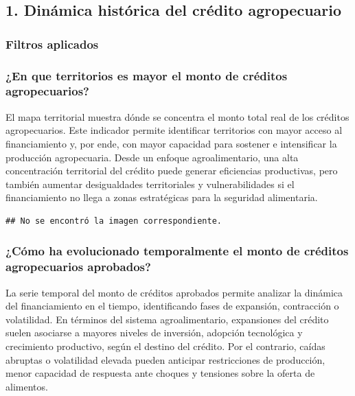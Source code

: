 \documentclass[
]{article}
\begin{document}
\subsection{1. Dinámica histórica del crédito
agropecuario}\label{dinuxe1mica-histuxf3rica-del-cruxe9dito-agropecuario}

\subsubsection{Filtros aplicados}\label{filtros-aplicados}

\subsubsection{¿En que territorios es mayor el monto de créditos
agropecuarios?}\label{en-que-territorios-es-mayor-el-monto-de-cruxe9ditos-agropecuarios}

El mapa territorial muestra dónde se concentra el monto total real de
los créditos agropecuarios. Este indicador permite identificar
territorios con mayor acceso al financiamiento y, por ende, con mayor
capacidad para sostener e intensificar la producción agropecuaria. Desde
un enfoque agroalimentario, una alta concentración territorial del
crédito puede generar eficiencias productivas, pero también aumentar
desigualdades territoriales y vulnerabilidades si el financiamiento no
llega a zonas estratégicas para la seguridad alimentaria.

\begin{verbatim}
## No se encontró la imagen correspondiente.
\end{verbatim}

\subsubsection{¿Cómo ha evolucionado temporalmente el monto de créditos
agropecuarios
aprobados?}\label{cuxf3mo-ha-evolucionado-temporalmente-el-monto-de-cruxe9ditos-agropecuarios-aprobados}

La serie temporal del monto de créditos aprobados permite analizar la
dinámica del financiamiento en el tiempo, identificando fases de
expansión, contracción o volatilidad. En términos del sistema
agroalimentario, expansiones del crédito suelen asociarse a mayores
niveles de inversión, adopción tecnológica y crecimiento productivo,
según el destino del crédito. Por el contrario, caídas abruptas o
volatilidad elevada pueden anticipar restricciones de producción, menor
capacidad de respuesta ante choques y tensiones sobre la oferta de
alimentos.
\end{document}
